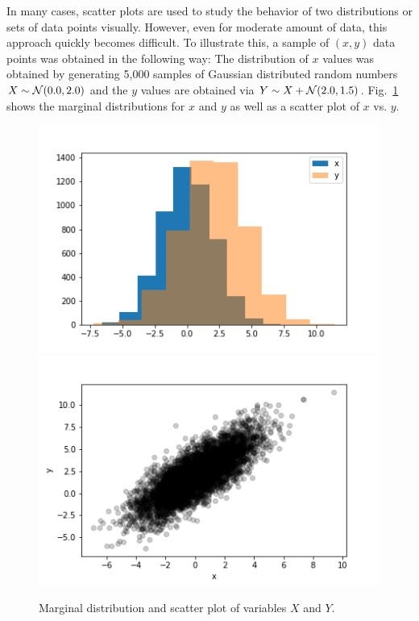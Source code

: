 \documentclass[BCOR=1mm, DIV=calc,10pt,
twoside=true,
twocolumn,
headings=normal]{scrartcl}
\newcommand{\fig}{Fig.~}
\begin{document}
In many cases, scatter plots are used to study the behavior of two distributions or sets of data points visually. However, even for moderate amount of data, this approach quickly becomes difficult. To illustrate this, a sample of $(x,y)$ data points was obtained in the following way: The distribution of $x$ values was obtained by generating 5,000 samples of Gaussian distributed random numbers $X \sim {\cal N}(0.0,2.0)$ and the $y$ values are obtained via $Y \sim X +  {\cal N}(2.0,1.5)$. \fig \ref{fig:scatter} shows the marginal distributions for $x$ and $y$ as well as a scatter plot of $x$ vs. $y$.

\begin{figure}
\begin{center}
\includegraphics[scale=0.5]{figs/marginal} \includegraphics[scale=0.5]{figs/scatter}
\caption{\label{fig:scatter} Marginal distribution and scatter plot of variables $X$ and $Y$.}
\end{center}
\end{figure}
\end{document}
